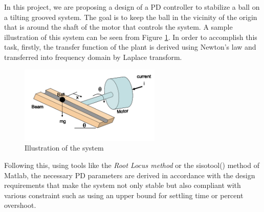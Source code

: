 In this project, we are proposing a design of a PD controller to stabilize a ball on a tilting grooved system. 
The goal is to keep the ball in the vicinity of the origin that is around the shaft of the motor that controls the system. A sample illustration of this system can be seen from Figure \ref{fig:illustration}. In order to accomplish this task, firstly, the transfer function of the plant is derived using Newton's law and transferred into frequency domain by Laplace transform. \\

\begin{figure}[H]
    \centering
    \includegraphics[width=0.6\textwidth]{images/intro_illustration.png}
    \caption{Illustration of the system}
    \label{fig:illustration}
\end{figure}

Following this, using tools like the \textit{Root Locus method} or the sisotool() method of Matlab, the necessary PD parameters are derived in accordance with the design requirements that make the system not only stable but also compliant with various constraint such as using an upper bound for settling time or percent overshoot.